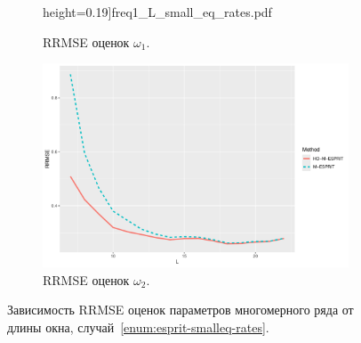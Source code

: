 \documentclass[specialist,
  substylefile=spbu_report.rtx,
subf,href,colorlinks=true, 12pt]{disser}
\theoremstyle{plain}
\theoremstyle{definition}
\theoremstyle{remark}
\begin{document}
\begin{figure}[!ht]
\begin{subfigure}{0.49\linewidth}
    height=0.19\textheight]{freq1_L_small_eq_rates.pdf}
    \caption{RRMSE оценок $\omega_1$.}
    \label{fig:freq1_L_small_eq_rates}
  \end{subfigure}
  \begin{subfigure}{0.49\linewidth}
    \includegraphics[width=\linewidth,
    height=0.19\textheight]{freq2_L_small_eq_rates.pdf}
    \caption{RRMSE оценок $\omega_2$.}
    \label{fig:freq2_L_small_eq_rates}
  \end{subfigure}
  \caption{Зависимость RRMSE оценок параметров многомерного ряда от
    длины окна,
  случай~\ref{enum:esprit-smalleq-rates}.}
  \label{fig:L_small_eq_rates}
\end{figure}
\end{document}
